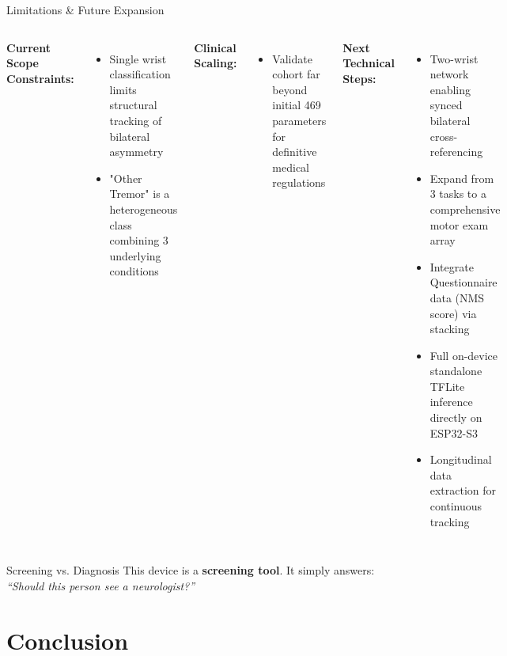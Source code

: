 \documentclass[aspectratio=169, 11pt]{beamer}
\begin{document}
\begin{frame}{Limitations \& Future Expansion}
  \begin{columns}[T]
      \small
      \textbf{Current Scope Constraints:}
      \begin{itemize}
        \item Single wrist classification limits structural tracking of bilateral asymmetry
        \item "Other Tremor" is a heterogeneous class combining 3 underlying conditions
      \end{itemize}
      \vspace{0.4em}
      \textbf{Clinical Scaling:}
      \begin{itemize}
        \item Validate cohort far beyond initial 469 parameters for definitive medical regulations
      \end{itemize}
      \small
      \textbf{Next Technical Steps:}
      \begin{itemize}
        \item Two-wrist network enabling synced bilateral cross-referencing
        \item Expand from 3 tasks to a comprehensive motor exam array
        \item Integrate Questionnaire data (NMS score) via stacking
        \item Full on-device standalone TFLite inference directly on ESP32-S3
        \item Longitudinal data extraction for continuous tracking
      \end{itemize}
  \end{columns}

  \vspace{0.5em}
  \begin{block}{Screening vs. Diagnosis}
    \small
    This device is a \textbf{screening tool}. It simply answers: 
    \emph{``Should this person see a neurologist?''}
  \end{block}
\end{frame}

\section{Conclusion}
\end{document}
